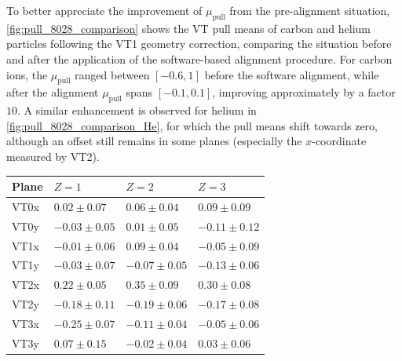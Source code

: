 To better appreciate the improvement of $\mu_\text{pull}$ from the pre-alignment situation, \autoref{fig:pull_8028_comparison} shows the VT pull means of carbon and helium particles following the VT1 geometry correction, comparing the situation before and after the application of the software-based alignment procedure. For carbon ions, the $\mu_\text{pull}$ ranged between $\left[-0.6,1\right]$ before the software alignment, while after the alignment $\mu_\text{pull}$ spans $\left[-0.1,0.1\right]$, improving approximately by a factor $10$. A similar enhancement is observed for helium in \autoref{fig:pull_8028_comparison_He}, for which the pull means shift towards zero, although an offset still remains in some planes (especially the $x$-coordinate measured by VT2).
\clearpage
\vspace*{\fill}
\begin{table}[H]
	\centering
	\normalsize{%
		\begin{tabular}{M{1.8cm} M{2.6cm} M{2.6cm} M{2.6cm}}
			\hline
			\textbf{Plane} & \textbf{$Z=1$} & \textbf{$Z=2$} & \textbf{$Z=3$} \\
			\hline
			VT0x & $0.02 \pm 0.07$  & $0.06 \pm 0.04$  & $0.09 \pm 0.09$  \\
			VT0y & $-0.03 \pm 0.05$ & $0.01 \pm 0.05$  & $-0.11 \pm 0.12$ \\
			VT1x & $-0.01 \pm 0.06$ & $0.09 \pm 0.04$  & $-0.05 \pm 0.09$ \\
			VT1y & $-0.03 \pm 0.07$ & $-0.07 \pm 0.05$ & $-0.13 \pm 0.06$ \\
			VT2x & $0.22 \pm 0.05$  & $0.35 \pm 0.09$  & $0.30 \pm 0.08$  \\
			VT2y & $-0.18 \pm 0.11$ & $-0.19 \pm 0.06$ & $-0.17 \pm 0.08$ \\
			VT3x & $-0.25 \pm 0.07$ & $-0.11 \pm 0.04$ & $-0.05 \pm 0.06$ \\
			VT3y & $0.07 \pm 0.15$  & $-0.02 \pm 0.04$ & $0.03 \pm 0.06$  \\

\end{tabular}}
\end{table}
